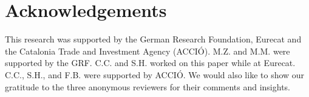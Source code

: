 \section{Acknowledgements}

This research was supported by the German Research Foundation, Eurecat and the Catalonia Trade
and Investment Agency (ACCI{\'O}). M.Z. and M.M. were supported by the GRF. C.C. and S.H. worked
on this paper while at Eurecat. C.C., S.H., and F.B. were supported by ACCI{\'O}. We would also
like to show our gratitude to the three anonymous reviewers for their comments and insights. 
